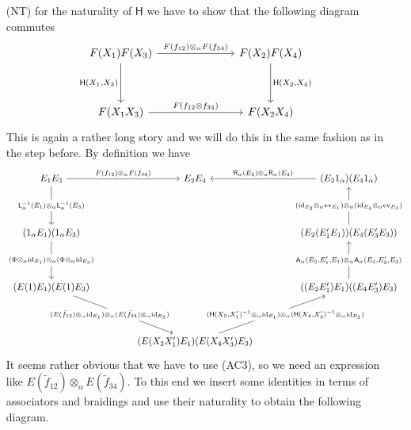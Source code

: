 \begin{prf}
\begin{enumerate}
\item[(NT)]
for the naturality of $\mathsf{H}$ we have to show that the following diagram commutes
\begin{equation*}
\begin{tikzcd}[row sep=3.6em,column sep=7em]
  F(X_{1}) F(X_{3})
  \ar{r}{F(f_{12}) \otimes_{\alpha} F(f_{34})}
  \ar{d}[swap]{\mathsf{H}(X_{1},X_{3})}
  &
  F(X_{2}) F(X_{4})
  \ar{d}{\mathsf{H}(X_{2},X_{4})}
  \\
  F(X_{1} X_{3})
  \ar{r}{F(f_{12} \otimes f_{34})}
  &
  F(X_{2} X_{4})
\end{tikzcd}
\end{equation*}
This is again a rather long story and we will do this in the same fashion as in the step before. By definition we have
\begin{equation*}
\begin{tikzcd}[row sep=4em,column sep=4.2em]
  E_{1} E_{3}
  \ar{r}{F(f_{12}) \otimes_{\alpha} F(f_{34})}
  \ar{d}[description]{\mathsf{L}_{\alpha}^{-1}(E_{1}) \otimes_{\alpha} \mathsf{L}_{\alpha}^{-1}(E_{3})}
  &
  E_{2} E_{4}
  &
  (E_{2} 1_{\alpha}) (E_{4} 1_{\alpha})
  \ar{l}[swap]{\mathsf{R}_{\alpha}(E_{2}) \otimes_{\alpha} \mathsf{R}_{\alpha}(E_{4})}
  \\
  (1_{\alpha} E_{1}) (1_{\alpha} E_{3})
  \ar{d}[description]{(\Phi \otimes_{\alpha} \mathrm{id}_{E_{1}}) \otimes_{\alpha} (\Phi \otimes_{\alpha} \mathrm{id}_{E_{3}})}
  &
  &
  (E_{2} (E_{1}^{\prime} E_{1})) (E_{4} (E_{3}^{\prime} E_{3}))
  \ar{u}[description]{(\mathrm{id}_{E_{2}} \otimes_{\alpha} \mathrm{ev}_{E_{1}}) \otimes_{\alpha} (\mathrm{id}_{E_{4}} \otimes_{\alpha} \mathrm{ev}_{E_{3}})}
  \\
  (E(1) E_{1}) (E(1) E_{3})
  \ar{rd}[description,xshift=-5mm]{(E(\tilde{f}_{12}) \otimes_{\alpha} \mathrm{id}_{E_{1}}) \otimes_{\alpha} (E(\tilde{f}_{34}) \otimes_{\alpha} \mathrm{id}_{E_{3}})}
  &
  &
  ((E_{2} E_{1}^{\prime}) E_{1}) ((E_{4} E_{3}^{\prime}) E_{3})
  \ar{u}[description]{\mathsf{A}_{\alpha}(E_{2},E_{1}^{\prime},E_{1}) \otimes_{\alpha} \mathsf{A}_{\alpha}(E_{4},E_{3}^{\prime},E_{3})}
  \\
  &
  (E(X_{2} X_{1}^{\prime}) E_{1}) (E(X_{4} X_{3}^{\prime}) E_{3})
  \ar{ur}[description,xshift=5mm]{(\mathsf{H}(X_{2},X_{1}^{\prime})^{-1} \otimes_{\alpha} \mathrm{id}_{E_{1}}) \otimes_{\alpha} (\mathsf{H}(X_{4},X_{3}^{\prime})^{-1} \otimes_{\alpha} \mathrm{id}_{E_{3}})}
  &
\end{tikzcd}
\end{equation*}
It seems rather obvious that we have to use (AC3), so we need an expression like $E(\tilde{f}_{12}) \otimes_{\alpha} E(\tilde{f}_{34})$. To this end we insert some identities in terms of associators and braidings and use their naturality to obtain the following diagram.

\end{enumerate}
\end{prf}
